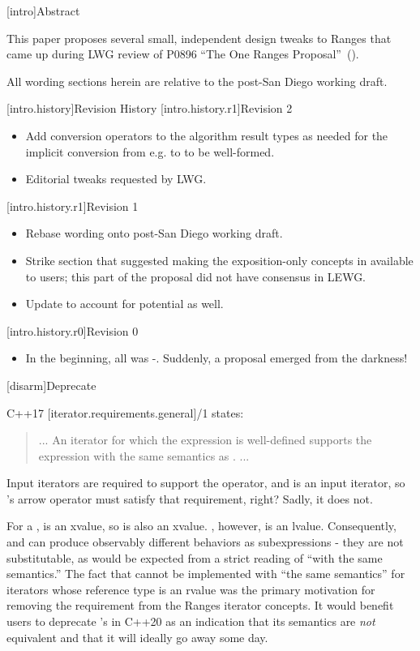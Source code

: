 [intro]{Abstract}

This paper proposes several small, independent design tweaks to Ranges that came
up during LWG review of P0896 ``The One Ranges Proposal''~(\cite{P0896}).

All wording sections herein are relative to the post-San Diego working draft.

[intro.history]{Revision History}
[intro.history.r1]{Revision 2}
\begin{itemize}
\item Add conversion operators to the algorithm result types as needed for the
  implicit conversion from e.g.  to
   to be well-formed.
\item Editorial tweaks requested by LWG.
\end{itemize}
[intro.history.r1]{Revision 1}
\begin{itemize}
\item Rebase wording onto post-San Diego working draft.
\item Strike section that suggested making the exposition-only concepts
  in  available to users; this part of the proposal
  did not have consensus in LEWG.
\item Update  to account for potential 
  as well.
\end{itemize}
[intro.history.r0]{Revision 0}
\begin{itemize}
\item In the beginning, all was \cv-. Suddenly, a proposal emerged
  from the darkness!
\end{itemize}

[disarm]{Deprecate }

C++17 [iterator.requirements.general]/1 states:
\begin{quote}
... An iterator  for which the expression  is well-defined
supports the expression  with the same semantics as . ...
\end{quote}
Input iterators are required to support the \tcode{->}
operator,
and  is an input iterator,
so 's arrow operator must satisfy that requirement, right?
Sadly, it does not.

For a ,  is an xvalue, so  is also
an xvalue. , however, is an lvalue. Consequently,  and
 can produce observably different behaviors as subexpressions - they
are not substitutable, as would be expected from a strict reading of ``with the
same semantics.'' The fact that \tcode{->} cannot be implemented with ``the same
semantics'' for iterators whose reference type is an rvalue was the primary
motivation for removing the \tcode{->} requirement from the Ranges iterator
concepts. It would benefit users to deprecate 's
 in C++20 as an indication that its semantics are \textit{not}
equivalent and that it will ideally go away some day.

